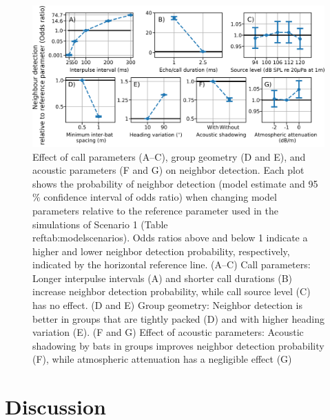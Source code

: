 \documentclass[
]{book}
\begin{document}
\begin{figure}[!htbp]
\includegraphics[]{original_papers/CPN_figures/Figure_4/Figure4_oddsratio_comparison.png}
\centering
\caption{Effect of call parameters (A–C), group geometry (D and E), and acoustic parameters (F and G) on neighbor detection. Each plot shows the probability of neighbor detection (model estimate and 95$\%$ confidence interval of odds ratio) when changing model parameters relative to the reference parameter used in the simulations of Scenario 1 (Table \\ref{tab:modelscenarios}). Odds ratios above and below 1 indicate a higher and lower neighbor detection probability, respectively, indicated by the horizontal reference line. (A–C) Call parameters: Longer interpulse intervals (A) and shorter call durations (B) increase neighbor detection probability, while call source level (C) has no effect. (D and E) Group geometry: Neighbor detection is better in groups that are tightly packed (D) and with higher heading variation (E). (F and G) Effect of acoustic parameters: Acoustic shadowing by bats in groups improves neighbor detection probability (F), while atmospheric attenuation has a negligible effect (G)} 
\label{cpn_fig4}
\end{figure}

\hypertarget{discussion}{%
\section{Discussion}\label{discussion}}
\end{document}
